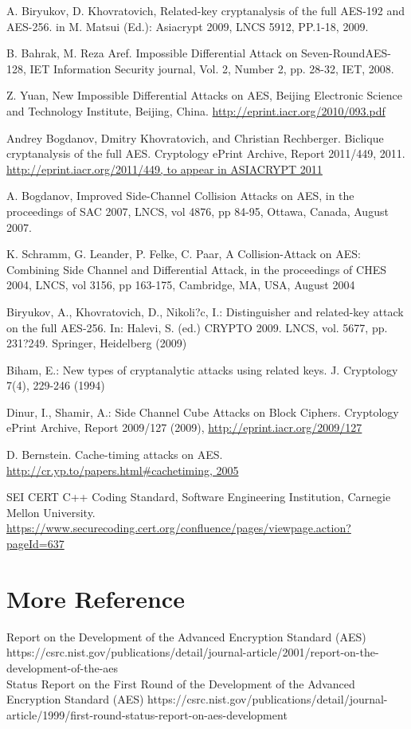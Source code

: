 \documentclass[twoside]{article}
\begin{document}
\begin{thebibliography}{99}
A. Biryukov, D. Khovratovich, Related-key cryptanalysis of the full AES-192 and AES-256. in M. Matsui (Ed.): Asiacrypt 2009, LNCS 5912, PP.1-18, 2009.

B. Bahrak, M. Reza Aref. Impossible Differential Attack on Seven-RoundAES-128, IET Information Security journal, Vol. 2, Number 2, pp. 28-32, IET, 2008. 

Z. Yuan, New Impossible Differential Attacks on AES, Beijing Electronic Science and Technology Institute, Beijing, China.
\newblock \url{http://eprint.iacr.org/2010/093.pdf}

Andrey Bogdanov, Dmitry Khovratovich, and Christian Rechberger. Biclique cryptanalysis of the full AES. Cryptology ePrint Archive, Report 2011/449, 2011.
\newblock \url{http://eprint.iacr.org/2011/449, to appear in ASIACRYPT 2011}

A. Bogdanov, Improved Side-Channel Collision Attacks on AES, in the proceedings of SAC 2007, LNCS, vol 4876, pp 84-95, Ottawa, Canada, August 2007.

K. Schramm, G. Leander, P. Felke, C. Paar, A Collision-Attack on AES: Combining Side Channel and Differential Attack, in the proceedings of CHES 2004, LNCS, vol 3156, pp 163-175, Cambridge, MA, USA, August 2004

Biryukov, A., Khovratovich, D., Nikoli?c, I.: Distinguisher and related-key attack on the full AES-256. In: Halevi, S. (ed.) CRYPTO 2009. LNCS, vol. 5677, pp. 231?249. Springer, Heidelberg (2009)

Biham, E.: New types of cryptanalytic attacks using related keys. J. Cryptology 7(4), 229-246 (1994)

Dinur, I., Shamir, A.: Side Channel Cube Attacks on Block Ciphers. Cryptology ePrint Archive, Report 2009/127 (2009),
\newblock \url{http://eprint.iacr.org/2009/127}

D. Bernstein. Cache-timing attacks on AES.
\newblock \url{http://cr.yp.to/papers.html\#cachetiming, 2005}

SEI CERT C++ Coding Standard, Software Engineering Institution, Carnegie Mellon University.
\newblock \url{https://www.securecoding.cert.org/confluence/pages/viewpage.action?pageId=637}

\end{thebibliography}

\section{More Reference}
Report on the Development of the Advanced Encryption Standard (AES)\\
https://csrc.nist.gov/publications/detail/journal-article/2001/report-on-the-development-of-the-aes\\

Status Report on the First Round of the Development of the Advanced Encryption Standard (AES)
https://csrc.nist.gov/publications/detail/journal-article/1999/first-round-status-report-on-aes-development

\end{document}

